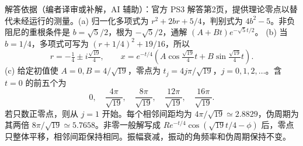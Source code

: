 \begin{solution}
解答依据（编者译审或补解，AI 辅助）：官方 PS3 解答第2页，提供理论零点以替代未经运行的测量。(a) 归一化多项式为 $r^2+2br+5/4$，判别式为 $4b^2-5$。非负阻尼的重根条件是 $b=\sqrt5/2$，根为 $-\sqrt5/2$，通解 $(A+Bt)e^{-\sqrt5t/2}$。
(b) 当 $b=1/4$，多项式可写为 $(r+1/4)^2+19/16$，所以
\[
 r=-\tfrac14\pm i\tfrac{\sqrt{19}}4,\qquad
 x=e^{-t/4}\left(A\cos\tfrac{\sqrt{19}}4t+B\sin\tfrac{\sqrt{19}}4t\right).
\]
(c) 给定初值使 $A=0,B=4/\sqrt{19}$，零点为 $t_j=4j\pi/\sqrt{19}$，$j=0,1,2,\ldots$。含 $t=0$ 的前五个为
\[
 0,\quad\frac{4\pi}{\sqrt{19}},\quad\frac{8\pi}{\sqrt{19}},\quad\frac{12\pi}{\sqrt{19}},\quad\frac{16\pi}{\sqrt{19}}.
\]
若只数正零点，则从 $j=1$ 开始。每个相邻间距均为 $4\pi/\sqrt{19}\simeq2.8829$，伪周期为其两倍 $8\pi/\sqrt{19}\simeq5.7658$。非零一般解写成 $Re^{-t/4}\cos(\sqrt{19}t/4-\phi)$ 后，零点只整体平移，相邻间距保持相同。振幅衰减，振动的角频率和伪周期保持不变。
\begin{center}\end{center}
\end{solution}

